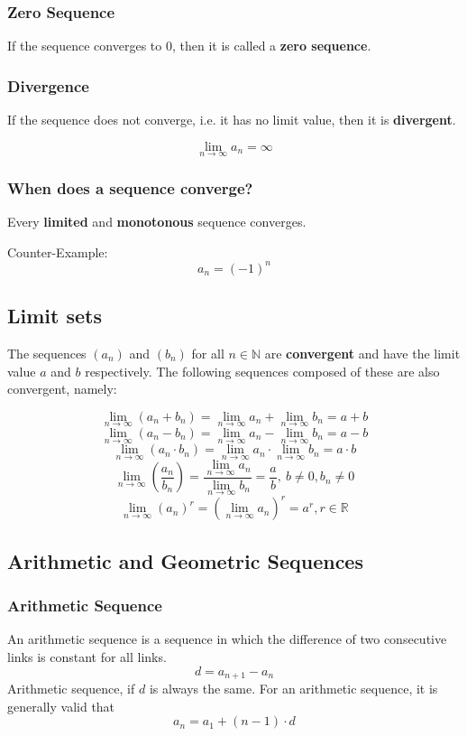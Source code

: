 \documentclass{book}
\begin{document}
\subsubsection{Zero Sequence}
If the sequence converges to $0$, then it is called a \textbf{zero sequence}.

\subsubsection{Divergence}
If the sequence does not converge, i.e. it has no limit value, then it is \textbf{divergent}.

\[
\lim\limits_{n\to \infty} a_{n} = \infty
\]

\subsubsection{When does a sequence converge?}
Every \textbf{limited} and \textbf{monotonous} sequence converges.

Counter-Example:
\[
  a_n = (-1)^n
\]

\subsection{Limit sets}
The sequences $(a_n)$ and $(b_n)$ for all $n \in \mathbb{N}$ are \textbf{convergent} and have the limit value $a$ and $b$ respectively. The following sequences composed of these are also convergent, namely:

\[
\lim\limits_{n\to \infty} (a_{n} + b_{n}) = \lim\limits_{n\to \infty} a_{n} + \lim\limits_{n\to \infty} b_{n} = a + b
\]
\[
\lim\limits_{n\to \infty} (a_{n} - b_{n}) = \lim\limits_{n\to \infty} a_{n} - \lim\limits_{n\to \infty} b_{n} = a - b
\]
\[
\lim\limits_{n\to \infty} (a_{n} \cdot b_{n}) = \lim\limits_{n\to \infty} a_{n} \cdot \lim\limits_{n\to \infty} b_{n} = a \cdot b
\]
\[
\lim\limits_{n\to \infty}(\frac{a_{n}}{b_{n}}) = \frac{\lim\limits_{n\to \infty} a_{n}}{\lim\limits_{n\to \infty} b_{n}} = \frac{a}{b}, \: b \ne 0, b_{n} \ne 0
\]
\[
\lim\limits_{n\to\infty} (a_{n})^{r} = \left(\lim\limits_{n\to\infty}a_{n}\right)^{r} = a^{r}, r \in \mathbb{R}
\]

\subsection{Arithmetic and Geometric Sequences}
\subsubsection{Arithmetic Sequence}
An arithmetic sequence is a sequence in which the difference of two consecutive links is constant for all links.
\[
  d = a_{n+1} - a_{n}
\]
Arithmetic sequence, if $d$ is always the same. For an arithmetic sequence, it is generally valid that
\[
  a_n = a_1 + (n-1)\cdot d
\]
\end{document}
